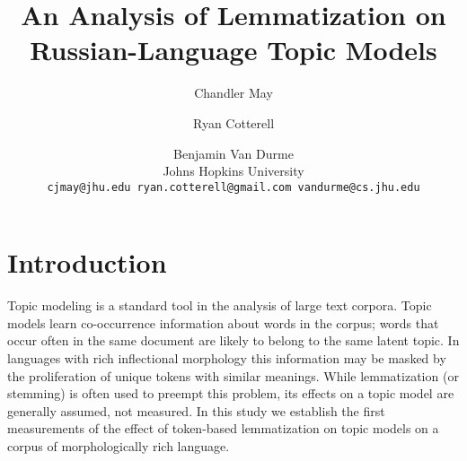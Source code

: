 \documentclass[11pt,letterpaper]{article}
\title{An Analysis of Lemmatization on Russian-Language Topic Models}
\author{Chandler May \and Ryan Cotterell \and Benjamin Van Durme \\
    Johns Hopkins University \\
    \texttt{cjmay@jhu.edu ryan.cotterell@gmail.com
    vandurme@cs.jhu.edu}}
\date{}
\begin{document}
\maketitle

\begin{abstract}
    
\end{abstract}


\section{Introduction}\label{sec:introduction}

Topic modeling is a standard tool in the analysis of large
text corpora. Topic models learn
co-occurrence information about words in the corpus;
words that occur often in the same document are likely to belong to
the same latent topic. In languages with rich inflectional
morphology this information may be masked by the proliferation of
unique tokens with similar meanings.  While lemmatization (or stemming)
is often used to preempt this problem, its effects on a topic model are
generally assumed, not measured.  In this study we establish the first
measurements of the effect of token-based lemmatization on topic models
on a corpus of morphologically rich language.
\end{document}
